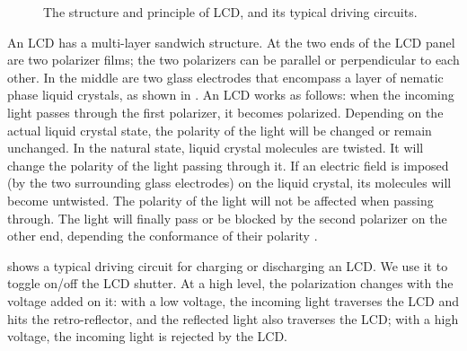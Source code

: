 \begin{figure}[th]
  \begin{center}
      \hfill
\vspace{-1.5em}
      \caption{The structure and principle of LCD, and its typical driving circuits. }\label{fig:lcd}
  \end{center}
\end{figure}

An LCD has a multi-layer sandwich structure. At the two ends of the LCD panel are two polarizer films; the two polarizers can be parallel or perpendicular to each other. In the middle are two glass electrodes that encompass a layer of nematic phase liquid crystals, as shown in . 
An LCD works as follows: when the incoming light passes through the first polarizer, it becomes polarized. Depending on the actual liquid crystal state, the polarity of the light will be changed or remain unchanged. 
In the natural state, liquid crystal molecules are twisted. It will change the polarity of the light passing through it. If an electric field is imposed (by the two surrounding glass electrodes) on the liquid crystal, its molecules will become untwisted. The polarity of the light will not be affected when passing through. The light will finally pass or be blocked by the second polarizer on the other end, depending the conformance of their polarity \cite{eavesdrop2}. %

 shows a typical driving circuit for charging or discharging an LCD. We use it to toggle on/off the LCD shutter.
At a high level, the polarization changes with the voltage added on it: with a low voltage, the incoming light traverses the LCD and hits the retro-reflector, and the reflected light also traverses the LCD; with a high voltage, the incoming light is rejected by the LCD. 




